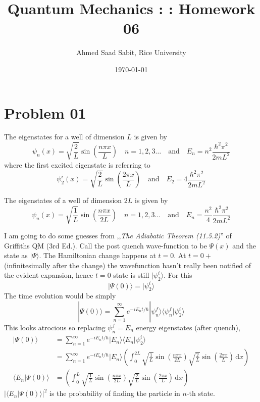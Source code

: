 \documentclass[letter]{article}
\title{Quantum Mechanics : : Homework 06}
\author{Ahmed Saad Sabit, Rice University}
\date{\today}
\newcommand{\hb}{\hbar}
\begin{document}
\maketitle

\section*{Problem 01}
The eigenstates for a well of dimension $L$ is given by 
\[
\psi_n(x) 
=
	\sqrt{\frac{2}{L}}  \sin\left(\frac{n \pi x}{L}\right) \quad n = 1,2,3 \ldots 
\quad \text{and} \quad
E_n = 
n^2 \frac{\hbar ^2 \pi ^2 }{2 m L^2}
\] 
where the first excited eigenstate is referring to 
\[
\psi_2^{i} (x) = 
\sqrt{\frac{2}{L}} 
\sin
\left(
\frac{2 \pi x}{L}
\right) \quad \text{and} \quad
E_2 = 4 \frac{\hbar ^2 \pi ^2 }{2 m L^2}
\] 


The eigenstates of a well of dimension $2L$ is given by
\[
\psi_n(x) 
=
	\sqrt{\frac{1}{L}}  \sin\left(\frac{n \pi x}{2L}\right) \quad n = 1,2,3 \ldots 
\quad \text{and} \quad 
E_n = 
\frac{n^2}{4} \frac{\hbar ^2 \pi ^2 }{2 m L^2}
\]

I am going to do some guesses from ,,\emph{The Adiabatic Theorem (11.5.2)}'' of Griffiths QM (3rd Ed.). 
Call the post quench wave-function to be $\Psi (x)$ and the state as $| \Psi \rangle $. 
The Hamiltonian change happens at $t = 0$. At $t = 0+$ (infinitesimally after the change) the wavefunction hasn't really been notified of the evident expansion, hence $t = 0$ state is still $| \psi_2^{i} \rangle $.
For this
\[
| \Psi(0) \rangle = | \psi_2^{i} \rangle 
\]
The time evolution would be simply 
\[
| \Psi(0) \rangle = \sum_{n=1}^{\infty} e^{- i E_n t / \hb} | \psi_n^{f} \rangle \langle \psi_n^{f} | \psi_2^{i} \rangle 
\] 
This looks atrocious so replacing $\psi_n^{f } = E_n$ energy eigenstates (after quench), 
\begin{align*}
	| \Psi(0) \rangle &= \sum_{n=1}^{\infty} e^{- i E_n t / \hb} | E_n \rangle \langle E_n | \psi_2^{i} \rangle \\
			  &= \sum_{n=1}^{\infty} e^{- i E_n t / \hb} 
| E_n \rangle 
	\left(
\int_{0}^{2L} \sqrt{\frac{1}{L}} \sin \left(\frac{n \pi x}{2L}\right) \sqrt{\frac{2}{L}} \sin \left(\frac{2 \pi x}{L}\right) \, \mathrm{d} x 
	\right) \\ 
	\langle E_n | \Psi(0 ) \rangle &=
	\left(
\int_{0}^{L} \sqrt{\frac{1}{L}} \sin \left(\frac{n \pi x}{2L}\right) \sqrt{\frac{2}{L}} \sin \left(\frac{2 \pi x}{L}\right) \, \mathrm{d} x 
	\right)
	\tag{The initial wave function is only defined for $0<x<L$ and $\psi(x) = 0$ outside this region}
\end{align*}
$| \langle E_n  | \Psi(0) \rangle |^2 $ is the probability of finding the particle in $n$-th state. 
\end{document}
